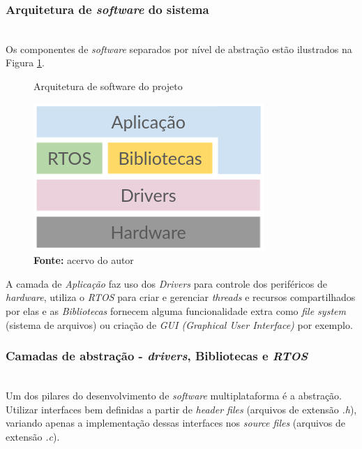 \documentclass[times, twoside, watermark]{artigo}
\begin{document}
\subsubsection{Arquitetura de \textit{software} do sistema}\hfill\\

Os componentes de \textit{software} separados por nível de abstração estão ilustrados
na Figura \ref{fig:arch2}.\hfill\\

\begin{figure}[H]
  \centering
  \caption{Arquitetura de software do projeto}
  \includegraphics[width=0.9\linewidth]{images/arch2.png}
  \caption*{\newline\textbf{Fonte:} acervo do autor}
  \label{fig:arch2}
\end{figure}

A camada de \textit{Aplicação} faz uso dos \textit{Drivers} para controle dos
periféricos de \textit{hardware}, utiliza o \textit{RTOS} para criar e gerenciar
\textit{threads} e recursos compartilhados por elas e as \textit{Bibliotecas}
fornecem alguma funcionalidade extra como \textit{file system} (sistema de arquivos)
ou criação de \textit{GUI (Graphical User Interface)} por exemplo.

\subsubsection{Camadas de abstração - \textit{drivers}, Bibliotecas e \textit{RTOS}}\hfill\\

Um dos pilares do desenvolvimento de \textit{software} multiplataforma é a abstração.
Utilizar interfaces bem definidas a partir de \textit{header files} (arquivos de
extensão \textit{.h}), variando apenas a implementação dessas interfaces nos
\textit{source files} (arquivos de extensão \textit{.c}).
\end{document}
